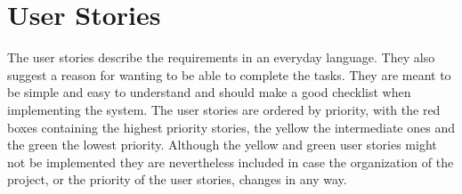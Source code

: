 \documentclass[paper=a4, fontsize=11pt]{scrartcl} %
\numberwithin{equation}{section} %
\numberwithin{figure}{section} %
\numberwithin{table}{section} %
\begin{document}
\clearpage

\section{User Stories}
The user stories describe the requirements in an everyday language. They also suggest a reason for wanting to be able to complete the tasks. They are meant to be simple and easy to understand and should make a good checklist when implementing the system. The user stories are ordered by priority, with the red boxes containing the highest priority stories, the yellow the intermediate ones and the green the lowest priority. Although the yellow and green user stories might not be implemented they are nevertheless included in case the organization of the project, or the priority of the user stories, changes in any way.
\begin{center}
\end{center}

\clearpage
\end{document}
